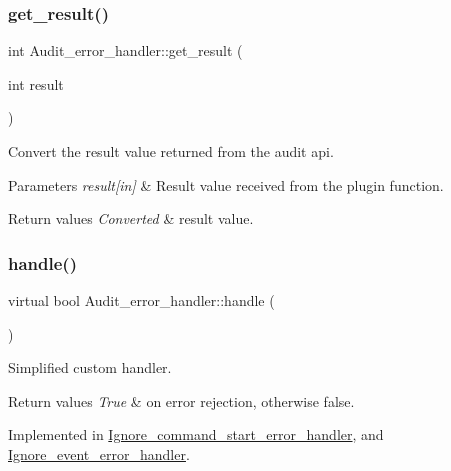 \subsubsection{\texorpdfstring{get\+\_\+result()}{get\_result()}}
{\footnotesize\ttfamily int Audit\+\_\+error\+\_\+handler\+::get\+\_\+result (\begin{DoxyParamCaption}\item[{int}]{result }\end{DoxyParamCaption})\hspace{0.3cm}{\ttfamily [inline]}}



Convert the result value returned from the audit api. 


\begin{DoxyParams}{Parameters}
{\em result\mbox{[}in\mbox{]}} & Result value received from the plugin function.\\
\hline
\end{DoxyParams}

\begin{DoxyRetVals}{Return values}
{\em Converted} & result value. \\
\hline
\end{DoxyRetVals}
\mbox{\label{classAudit__error__handler_aa674ae49782d768001e7bd1d11f16c68}} 
\subsubsection{\texorpdfstring{handle()}{handle()}}
{\footnotesize\ttfamily virtual bool Audit\+\_\+error\+\_\+handler\+::handle (\begin{DoxyParamCaption}{ }\end{DoxyParamCaption})\hspace{0.3cm}{\ttfamily [pure virtual]}}



Simplified custom handler. 


\begin{DoxyRetVals}{Return values}
{\em True} & on error rejection, otherwise false. \\
\hline
\end{DoxyRetVals}


Implemented in \mbox{\hyperlink{classIgnore__command__start__error__handler_a237add9c946d5b5f76c40483bde4a4b7}{Ignore\+\_\+command\+\_\+start\+\_\+error\+\_\+handler}}, and \mbox{\hyperlink{classIgnore__event__error__handler_a0ade890f86d2a321f78f90ed446328a6}{Ignore\+\_\+event\+\_\+error\+\_\+handler}}.

